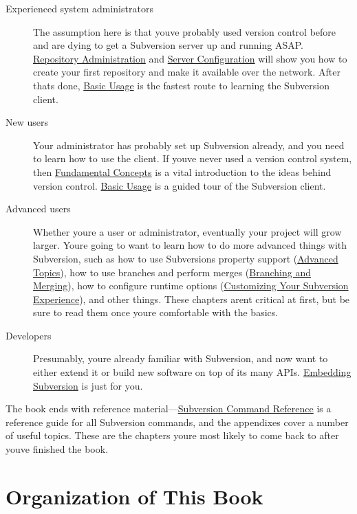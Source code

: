 \begin{description}
\item[Experienced system administrators]
The assumption here is that you\textquotesingle ve probably used version
control before and are dying to get a Subversion server up and running
ASAP. \hyperref[svn.reposadmin]{Repository Administration} and
\hyperref[svn.serverconfig]{Server Configuration} will show you how to
create your first repository and make it available over the network.
After that\textquotesingle s done, \hyperref[svn.tour]{Basic Usage} is
the fastest route to learning the Subversion client.
\item[New users]
Your administrator has probably set up Subversion already, and you need
to learn how to use the client. If you\textquotesingle ve never used a
version control system, then \hyperref[svn.basic]{Fundamental Concepts}
is a vital introduction to the ideas behind version control.
\hyperref[svn.tour]{Basic Usage} is a guided tour of the Subversion
client.
\item[Advanced users]
Whether you\textquotesingle re a user or administrator, eventually your
project will grow larger. You\textquotesingle re going to want to learn
how to do more advanced things with Subversion, such as how to use
Subversion\textquotesingle s property support
(\hyperref[svn.advanced]{Advanced Topics}), how to use branches and
perform merges (\hyperref[svn.branchmerge]{Branching and Merging}), how
to configure runtime options (\hyperref[svn.customization]{Customizing
Your Subversion Experience}), and other things. These chapters
aren\textquotesingle t critical at first, but be sure to read them once
you\textquotesingle re comfortable with the basics.
\item[Developers]
Presumably, you\textquotesingle re already familiar with Subversion, and
now want to either extend it or build new software on top of its many
APIs. \hyperref[svn.developer]{Embedding Subversion} is just for you.
\end{description}

The book ends with reference material---\hyperref[svn.ref]{Subversion
Command Reference} is a reference guide for all Subversion commands, and
the appendixes cover a number of useful topics. These are the chapters
you\textquotesingle re most likely to come back to after
you\textquotesingle ve finished the book.

\section{Organization of This Book}\label{svn.preface.organization}

